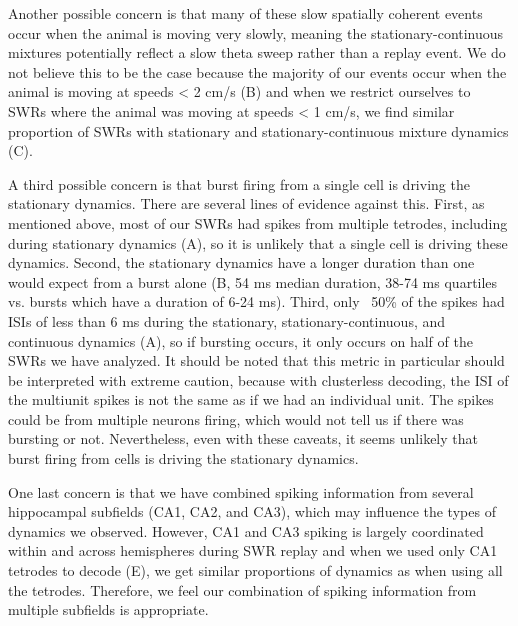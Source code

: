 \documentclass[9pt,lineno]{elife}
\begin{document}
Another possible concern is that many of these slow spatially coherent events occur when the animal is moving very slowly, meaning the stationary-continuous mixtures potentially reflect a slow theta sweep rather than a replay event. We do not believe this to be the case because the majority of our events occur when the animal is moving at speeds < 2 cm/s (B) and when we restrict ourselves to SWRs where the animal was moving at speeds < 1 cm/s, we find similar proportion of SWRs with stationary and stationary-continuous mixture dynamics (C).

A third possible concern is that burst firing from a single cell is driving the stationary dynamics. There are several lines of evidence against this. First, as mentioned above, most of our SWRs had spikes from multiple tetrodes, including during stationary dynamics (A), so it is unlikely that a single cell is driving these dynamics. Second, the stationary dynamics have a longer duration than one would expect from a burst alone (B, 54 ms median duration, 38-74 ms quartiles vs. bursts which have a duration of 6-24 ms). Third, only ~50\% of the spikes had ISIs of less than 6 ms during the stationary, stationary-continuous, and continuous dynamics (A), so if bursting occurs, it only occurs on half of the SWRs we have analyzed. It should be noted that this metric in particular should be interpreted with extreme caution, because with clusterless decoding, the ISI of the multiunit spikes is not the same as if we had an individual unit. The spikes could be from multiple neurons firing, which would not tell us if there was bursting or not. Nevertheless, even with these caveats, it seems unlikely that burst firing from cells is driving the stationary dynamics.

One last concern is that we have combined spiking information from several hippocampal subfields (CA1, CA2, and CA3), which may influence the types of dynamics we observed. However, CA1 and CA3 spiking is largely coordinated within and across hemispheres during SWR replay \citep{CarrTransientSlowGamma2012} and when we used only CA1 tetrodes to decode (E), we get similar proportions of dynamics as when using all the tetrodes. Therefore, we feel our combination of spiking information from multiple subfields is appropriate.
\end{document}
